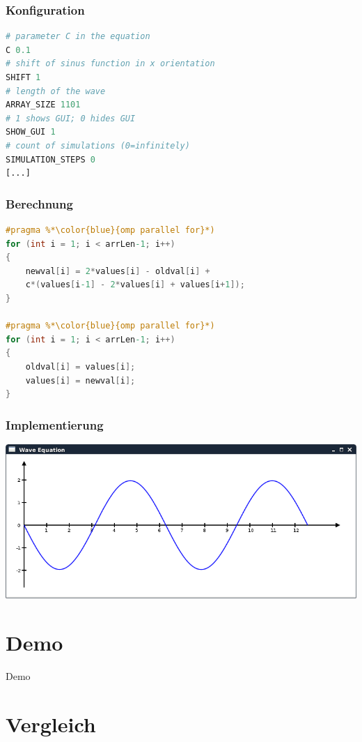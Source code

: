 \documentclass[xcolor=dvipsnames]{beamer}
\begin{document}
\begin{frame}[fragile]\frametitle{Konfiguration}
\begin{lstlisting}[language=Python]
# parameter C in the equation
C 0.1
# shift of sinus function in x orientation
SHIFT 1
# length of the wave
ARRAY_SIZE 1101
# 1 shows GUI; 0 hides GUI
SHOW_GUI 1
# count of simulations (0=infinitely)
SIMULATION_STEPS 0
[...]
\end{lstlisting}
\end{frame}

\begin{frame}[fragile]\frametitle{Berechnung}
\begin{lstlisting}[language=C]
#pragma %*\color{blue}{omp parallel for}*)
for (int i = 1; i < arrLen-1; i++)
{ 
    newval[i] = 2*values[i] - oldval[i] + 
    c*(values[i-1] - 2*values[i] + values[i+1]);
}

#pragma %*\color{blue}{omp parallel for}*)
for (int i = 1; i < arrLen-1; i++)
{ 
    oldval[i] = values[i];
    values[i] = newval[i];
}
\end{lstlisting}
\end{frame}

\begin{frame}\frametitle{Implementierung}
	\centering
	\includegraphics[width=1.0\textwidth,valign=t]{pictures/gui}
\end{frame}

\section{Demo}
\begin{frame}
	\centering
	\textcolor{htwgreen}{{\LARGE Demo}}
\end{frame}

\section{Vergleich}
\frame{\tableofcontents[current]}
\end{document}

